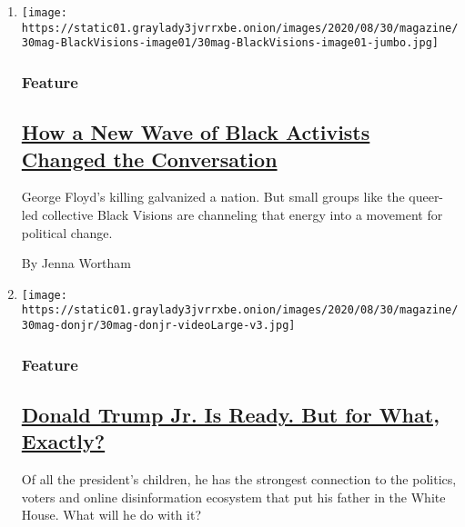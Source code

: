 \begin{enumerate}
\def\labelenumi{\arabic{enumi}.}
\item
  \texttt{[image: https://static01.graylady3jvrrxbe.onion/images/2020/08/30/magazine/30mag-BlackVisions-image01/30mag-BlackVisions-image01-jumbo.jpg]}

  \hypertarget{feature}{%
  \subsubsection{Feature}\label{feature}}

  \hypertarget{how-a-new-wave-of-black-activists-changed-the-conversation}{%
  \subsection{\texorpdfstring{\href{/2020/08/25/magazine/black-visions-collective.html}{How
  a New Wave of Black Activists Changed the
  Conversation}}{How a New Wave of Black Activists Changed the Conversation}}\label{how-a-new-wave-of-black-activists-changed-the-conversation}}

  George Floyd's killing galvanized a nation. But small groups like the
  queer-led collective Black Visions are channeling that energy into a
  movement for political change.

  By Jenna Wortham
\item
  \texttt{[image: https://static01.graylady3jvrrxbe.onion/images/2020/08/30/magazine/30mag-donjr/30mag-donjr-videoLarge-v3.jpg]}

  \hypertarget{feature-1}{%
  \subsubsection{Feature}\label{feature-1}}

  \hypertarget{donald-trump-jr-is-ready-but-for-what-exactly}{%
  \subsection{\texorpdfstring{\href{/2020/08/24/magazine/donald-trump-jr.html}{Donald
  Trump Jr. Is Ready. But for What,
  Exactly?}}{Donald Trump Jr. Is Ready. But for What, Exactly?}}\label{donald-trump-jr-is-ready-but-for-what-exactly}}

  Of all the president's children, he has the strongest connection to
  the politics, voters and online disinformation ecosystem that put his
  father in the White House. What will he do with it?


\end{enumerate}
